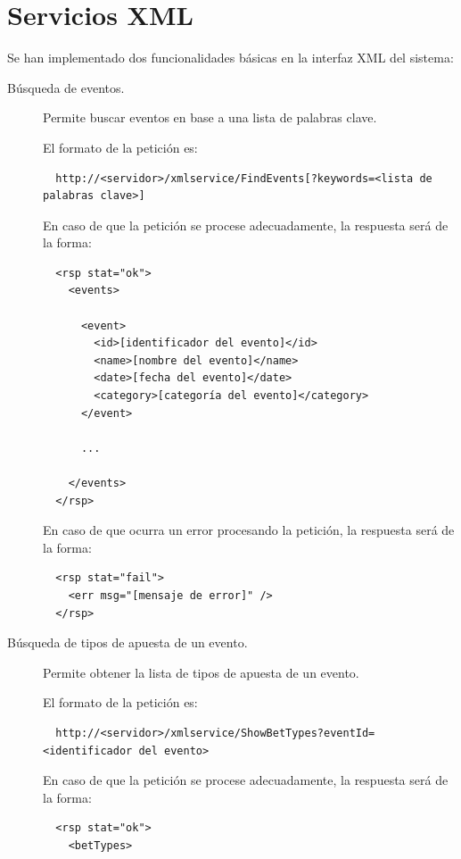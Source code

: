 \documentclass[a4paper,twoside]{article}
\begin{document}
\newpage
\section{Servicios XML}

Se han implementado dos funcionalidades básicas en la interfaz XML del sistema:

\begin{description}
\item[Búsqueda de eventos.] Permite buscar eventos en base a una lista de palabras clave.
  
  El formato de la petición es:

\begin{verbatim}
  http://<servidor>/xmlservice/FindEvents[?keywords=<lista de palabras clave>]
\end{verbatim}

En caso de que la petición se procese adecuadamente, la respuesta será de la forma:

\begin{verbatim}
  <rsp stat="ok">
    <events>

      <event>
        <id>[identificador del evento]</id>
        <name>[nombre del evento]</name>
        <date>[fecha del evento]</date>
        <category>[categoría del evento]</category>
      </event>

      ...

    </events>
  </rsp>
\end{verbatim}

En caso de que ocurra un error procesando la petición, la respuesta será de la forma:

\begin{verbatim}
  <rsp stat="fail">
    <err msg="[mensaje de error]" />
  </rsp>  
\end{verbatim}




\item[Búsqueda de tipos de apuesta de un evento.] Permite obtener la lista de tipos de apuesta de un evento.
  
  El formato de la petición es:

\begin{verbatim}
  http://<servidor>/xmlservice/ShowBetTypes?eventId=<identificador del evento>
\end{verbatim}

En caso de que la petición se procese adecuadamente, la respuesta será de la forma:

\begin{verbatim}
  <rsp stat="ok">
    <betTypes>


\end{verbatim}
\end{description}
\end{document}
